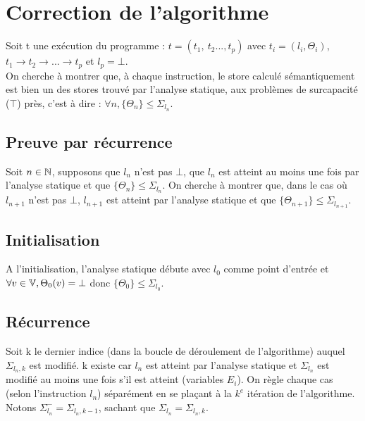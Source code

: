 
\section{Correction de l'algorithme}
Soit t une exécution du programme : $t=(t_1,\ t_2..., t_p)$ avec $t_i=(l_i, \Theta_i)$, $t_1\longrightarrow t_2\longrightarrow ...\longrightarrow t_p$ et $l_p = \bot$.\\
On cherche à montrer que, à chaque instruction, le store calculé sémantiquement est bien un des stores trouvé par l'analyse statique, aux problèmes de surcapacité ($\top$) près, c'est à dire : $\forall n, \{\Theta_n\}\leq\Sigma_{l_n}$.


\subsection{Preuve par récurrence}
Soit $n\in \mathbb N$, supposons que $l_n$ n'est pas $\bot$, que $l_n$ est atteint au moins une fois par l'analyse statique et que $\{\Theta_n\}\leq\Sigma_{l_n}$. On cherche à montrer que, dans le cas où $l_{n+1}$ n'est pas $\bot$, $l_{n+1}$ est atteint par l'analyse statique et que $\{\Theta_{n+1}\}\leq\Sigma_{l_{n+1}}$.
\subsection{Initialisation}
A l'initialisation, l'analyse statique débute avec $l_0$ comme point d'entrée et $\forall v\in\mathbb V, \Theta_0(v)=\bot$ donc $\{\Theta_0\}\leq\Sigma_{l_0}$.
\subsection{Récurrence}
Soit k le dernier indice (dans la boucle de déroulement de l'algorithme) auquel $\Sigma_{{l_n},k}$ est modifié. k existe car $l_n$ est atteint par l'analyse statique et $\Sigma_{l_n}$ est modifié au moins une fois s'il est atteint (variables $E_i$). On règle chaque cas (selon l'instruction $l_n$) séparément en se plaçant à la $k^e$ itération de l'algorithme.\\
Notons $\Sigma^{-}_{l_n}=\Sigma_{{l_n},k-1}$, sachant que $\Sigma_{l_n}=\Sigma_{{l_n},k}$.


